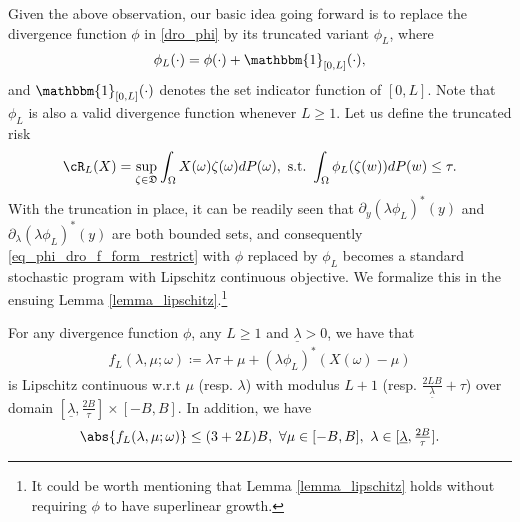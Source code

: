 \documentclass[9pt]{article} %
\numberwithin{equation}{section}
\renewcommand{\frac}[2]{\tfrac{#1}{#2}}
\begin{document}
Given the above observation,   
our basic idea going forward is to replace the divergence function $\phi$ in \eqref{dro_phi}  by its truncated variant $\phi_L$, where 
\begin{align*}
\phi_L(\cdot) = \phi (\cdot) + \mathbbm{1}_{[0,L]}(\cdot),
\end{align*}
and $\mathbbm{1}_{[0,L]}(\cdot)$ denotes the set indicator function of $[0,L]$. 
Note that $\phi_L$ is also a valid divergence function whenever $L \geq 1$.
Let us define the truncated risk 
\begin{align}\label{phi_d_truncate}
        \cR_L(X) = \sup_{\zeta \in \mathfrak{D}} \int_{\Omega} X(\omega) \zeta(\omega) d P(\omega) , ~ \mathrm{s.t.}~ 
         \int_{\Omega} \phi_L(\zeta(w)) d P(w) \leq \tau.
\end{align}
With the truncation in place, it can be readily seen that $\partial_y (\lambda \phi_L)^*(y)$ and $\partial_\lambda (\lambda \phi_L)^*(y)$ are both bounded sets, 
and consequently \eqref{eq_phi_dro_f_form_restrict} with $\phi$ replaced by $\phi_L$ becomes a standard stochastic program with Lipschitz continuous objective. 
We formalize this in the ensuing Lemma \ref{lemma_lipschitz}.\footnote{
It could be worth mentioning that Lemma \ref{lemma_lipschitz} holds without requiring $\phi$ to have superlinear growth. 
}




\begin{lemma}\label{lemma_lipschitz}
For any divergence function $\phi$, any $L \geq 1$ and $\underline{\lambda} > 0$,
we have that
\begin{align}\label{def_f_truncate}
f_L(\lambda, \mu; \omega) \coloneqq  \lambda \tau + \mu + (\lambda \phi_L)^*(X(\omega) - \mu)
\end{align}
is Lipschitz continuous w.r.t $\mu$ (resp. $\lambda$) with modulus $L+1$ (resp. $\frac{2LB}{\underline{\lambda}} + \tau$) 
over domain 
$ [\underline{\lambda},  \frac{2B}{\tau}] \times [-B, B]$. 
In addition, we have 
\begin{align}\label{dual_stoch_obj_bound}
\abs{f_L(\lambda, \mu; \omega) } \leq (3 + 2L) B , ~ \forall 
\mu  \in [-B, B], ~ \lambda \in [\underline{\lambda},  \frac{2B}{\tau}].
\end{align}
\end{lemma}
\end{document}
